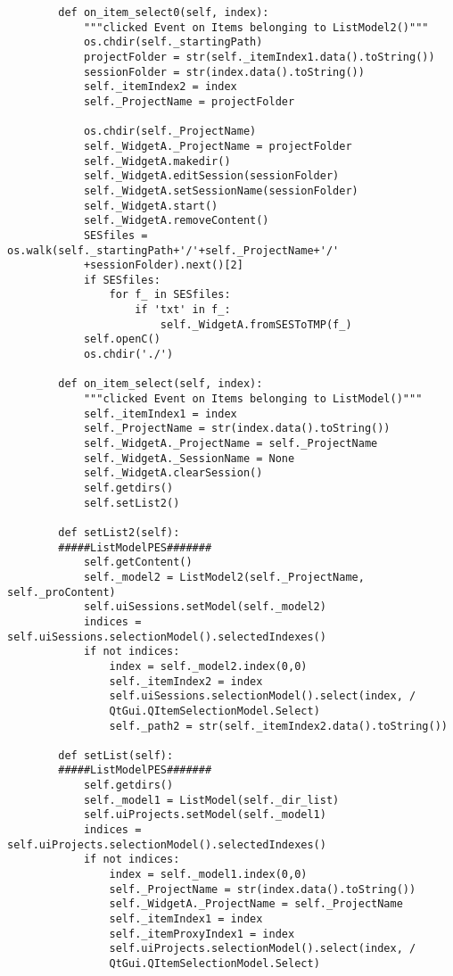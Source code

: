 \begin{verbatim}
        def on_item_select0(self, index):
            """clicked Event on Items belonging to ListModel2()"""
            os.chdir(self._startingPath)
            projectFolder = str(self._itemIndex1.data().toString())
            sessionFolder = str(index.data().toString())
            self._itemIndex2 = index
            self._ProjectName = projectFolder
    
            os.chdir(self._ProjectName)
            self._WidgetA._ProjectName = projectFolder
            self._WidgetA.makedir()
            self._WidgetA.editSession(sessionFolder)
            self._WidgetA.setSessionName(sessionFolder)
            self._WidgetA.start()
            self._WidgetA.removeContent()
            SESfiles = os.walk(self._startingPath+'/'+self._ProjectName+'/'
            +sessionFolder).next()[2]
            if SESfiles:
                for f_ in SESfiles:
                    if 'txt' in f_:
                        self._WidgetA.fromSESToTMP(f_)
            self.openC()
            os.chdir('./')
    
        def on_item_select(self, index):
            """clicked Event on Items belonging to ListModel()"""
            self._itemIndex1 = index
            self._ProjectName = str(index.data().toString())
            self._WidgetA._ProjectName = self._ProjectName
            self._WidgetA._SessionName = None
            self._WidgetA.clearSession()
            self.getdirs()
            self.setList2()
    
        def setList2(self):
        #####ListModelPES#######
            self.getContent()
            self._model2 = ListModel2(self._ProjectName, self._proContent)
            self.uiSessions.setModel(self._model2)
            indices = self.uiSessions.selectionModel().selectedIndexes()
            if not indices:
                index = self._model2.index(0,0)
                self._itemIndex2 = index
                self.uiSessions.selectionModel().select(index, /
                QtGui.QItemSelectionModel.Select)
                self._path2 = str(self._itemIndex2.data().toString())
    
        def setList(self):
        #####ListModelPES#######
            self.getdirs() 
            self._model1 = ListModel(self._dir_list)
            self.uiProjects.setModel(self._model1)
            indices = self.uiProjects.selectionModel().selectedIndexes()
            if not indices:
                index = self._model1.index(0,0)
                self._ProjectName = str(index.data().toString())
                self._WidgetA._ProjectName = self._ProjectName
                self._itemIndex1 = index
                self._itemProxyIndex1 = index
                self.uiProjects.selectionModel().select(index, /
                QtGui.QItemSelectionModel.Select)
    

\end{verbatim}
